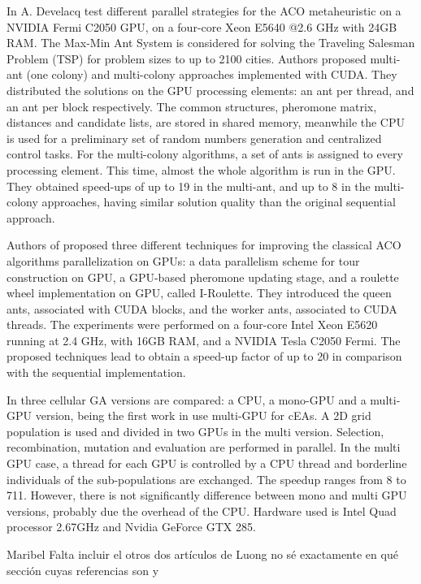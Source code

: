 \documentclass[prodmode,acmtecs]{acmsmall}
\begin{document}
In \cite{ACO-on-GPU_Develacq} A. Develacq test different parallel strategies for the ACO metaheuristic on a NVIDIA Fermi C2050 GPU, on a four-core Xeon E5640 @2.6 GHz with 24GB RAM. The Max-Min Ant System is considered for solving the Traveling Salesman Problem (TSP) for problem sizes to up to 2100 cities. Authors proposed multi-ant (one colony) and multi-colony approaches implemented with CUDA. They distributed the solutions on the GPU processing elements: an ant per thread, and an ant per block respectively. The common structures, pheromone matrix, distances and candidate lists, are stored in shared memory, meanwhile the CPU is used for a preliminary set of random numbers generation and centralized control tasks. For the multi-colony algorithms, a set of ants is assigned to every processing element. This time, almost the whole algorithm is run in the GPU. They obtained speed-ups of up to 19 in the multi-ant, and up to 8 in the multi-colony approaches, having similar solution quality than the original sequential approach.

Authors of \cite{Cecilia201342} proposed three different techniques for improving the classical ACO algorithms parallelization on GPUs: a data parallelism scheme for tour construction on GPU, a GPU-based pheromone updating stage, and a roulette wheel implementation on GPU, called I-Roulette. They introduced the queen ants, associated with CUDA blocks, and the worker ants, associated to CUDA threads. The experiments were performed on a four-core Intel Xeon E5620 running at 2.4 GHz, with 16GB RAM, and a NVIDIA Tesla C2050 Fermi. The proposed techniques lead to obtain a speed-up factor of up to 20 in comparison with the sequential implementation.


In \cite{5586530} three cellular GA versions are compared: a CPU, a mono-GPU and a multi-GPU version, being the first work in use multi-GPU for cEAs. A 2D grid population is used and divided in two GPUs in the multi version. Selection, recombination, mutation and evaluation are performed in parallel. In the multi GPU case, a thread for each GPU is controlled by a CPU thread and borderline individuals of the sub-populations are exchanged. The
speedup ranges from 8 to 711. However, there is not significantly difference between mono and multi GPU versions, probably due the overhead of the CPU. Hardware used is Intel Quad processor 2.67GHz and Nvidia GeForce GTX 285. %

Maribel
Falta incluir el otros dos artículos de Luong no sé exactamente en qué sección cuyas referencias son \cite{luong:Neighborhood2010} y \cite{LuongParallelHybridEvolutionaryAlgorithmsOnGPUCEC2010}
\end{document}
